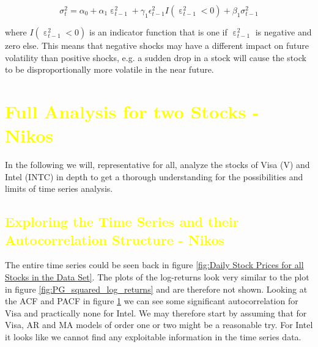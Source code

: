 \begin{equation}
    \sigma^2_t = \alpha_0 + \alpha_1 \upepsilon^2_{t-1} + \gamma_1 \epsilon^2_{t-1} I(\upepsilon^2_{t-1} < 0) + \beta_1 \sigma^2_{t-1} \label{eg:garch3}
\end{equation}{}

where $I(\upepsilon^2_{t-1} < 0)$ is an indicator function that is one if $\upepsilon^2_{t-1}$ is negative and zero else. This means that negative shocks may have a different impact on future volatility than positive shocks, e.g. a sudden drop in a stock will cause the stock to be disproportionally more volatile in the near future. 

\section{\textcolor{yellow}{Full Analysis for two Stocks  - Nikos}}
In the following we will, representative for all, analyze the stocks of Visa (V) and Intel (INTC) in depth to get a thorough understanding for the possibilities and limits of time series analysis. 

\subsection{\textcolor{yellow}{Exploring the Time Series and their Autocorrelation Structure -  Nikos}}
The entire time series could be seen back in figure \ref{fig:Daily Stock Prices for all Stocks in the Data Set}. The plots of the log-returns look very similar to the plot in figure \ref{fig:PG_squared_log_returns} and are therefore not shown. Looking at the ACF and PACF in figure \ref{fig:INTC_V_ACF_log_returns} we can see some significant autocorrelation for Visa and practically none for Intel. We may therefore start by assuming that for Visa, AR and MA models of order one or two might be a reasonable try. For Intel it looks like we cannot find any exploitable information in the time series data. 

\begin{figure}[h!]
    \centering
    \begin{adjustbox}{width=.95\textwidth,center}
    
    \end{adjustbox}
    \begin{adjustbox}{width=.95\textwidth,center}
    
    \end{adjustbox} 
    \caption{}
    \label{fig:INTC_V_ACF_log_returns}
\end{figure}{}

